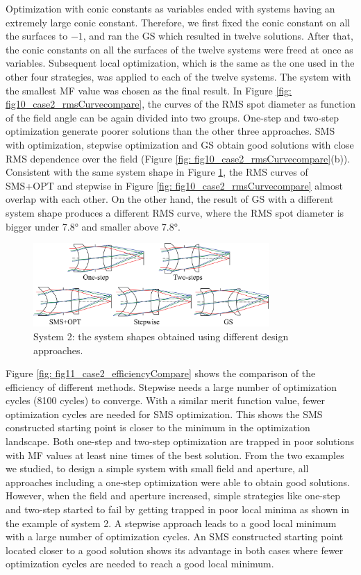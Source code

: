 Optimization with conic constants as variables ended with systems having an extremely large conic constant. Therefore, we first fixed the conic constant on all the surfaces to $-1$, and ran the GS which resulted in twelve solutions. After that, the conic constants on all the surfaces of the twelve systems were freed at once as variables. Subsequent local optimization, which is the same as the one used in the other four strategies, was applied to each of the twelve systems. The system with the smallest MF value was chosen as the final result. In Figure \ref{fig: fig10_case2_rmsCurvecompare}, the curves of the RMS spot diameter as function of the field angle can be again divided into two groups. One-step and two-step optimization generate poorer solutions than the other three approaches. SMS with optimization, stepwise optimization and GS obtain good solutions with close RMS dependence over the field (Figure \ref{fig: fig10_case2_rmsCurvecompare}(b)). Consistent with the same system shape in Figure \ref{fig: fig9_case2_systems}, the RMS curves of SMS+OPT and stepwise in Figure \ref{fig: fig10_case2_rmsCurvecompare} almost overlap with each other. On the other hand, the result of GS with a different system shape produces a different RMS curve, where the RMS spot diameter is bigger under 7.8° and smaller above 7.8°.

\begin{figure}[h!]
    \centering
    \includegraphics[width=0.8\textwidth]{chapter-5/figures/Figure9_system2_solutions.png}
    \caption{System 2: the system shapes obtained using different design approaches.}
    \label{fig: fig9_case2_systems}
\end{figure}

Figure \ref{fig: fig11_case2_efficiencyCompare} shows the comparison of the efficiency of different methods. Stepwise needs a large number of optimization cycles (8100 cycles) to converge. With a similar merit function value, fewer optimization cycles are needed for SMS optimization. This shows the SMS constructed starting point is closer to the minimum in the optimization landscape. Both one-step and two-step optimization are trapped in poor solutions with MF values at least nine times of the best solution. 
From the two examples we studied, to design a simple system with small field and aperture, all approaches including a one-step optimization were able to obtain good solutions. However, when the field and aperture increased, simple strategies like one-step and two-step started to fail by getting trapped in poor local minima as shown in the example of system 2. A stepwise approach leads to a good local minimum with a large number of optimization cycles. An SMS constructed starting point located closer to a good solution shows its advantage in both cases where fewer optimization cycles are needed to reach a good local minimum.

